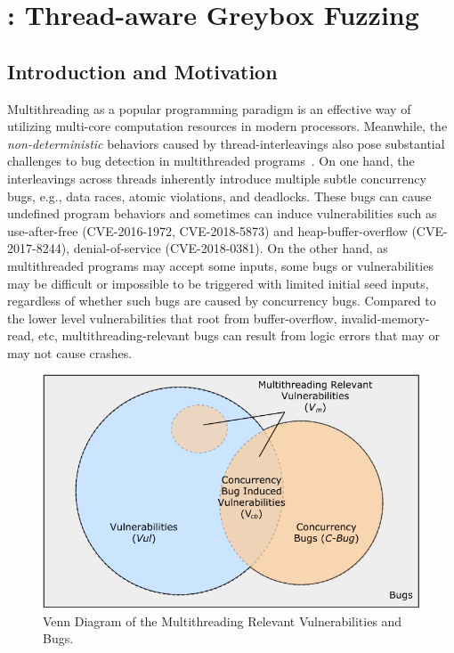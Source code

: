 
\chapter{\mtfuzz: Thread-aware Greybox Fuzzing} \label{ch:mtfuzz}

\section{Introduction and Motivation}\label{sec:mtfuzz_intro}

Multithreading as a popular programming paradigm is an effective way of utilizing multi-core computation resources in modern processors. Meanwhile, the \emph{non-deterministic} behaviors caused by thread-interleavings also pose substantial challenges to bug detection in multithreaded programs~\cite{mtbugs_survey}. On one hand, the interleavings across threads inherently introduce multiple subtle concurrency bugs, e.g., data races, atomic violations, and deadlocks. These bugs can cause undefined program behaviors and sometimes can induce vulnerabilities such as use-after-free (CVE-2016-1972, CVE-2018-5873) and heap-buffer-overflow (CVE-2017-8244), denial-of-service (CVE-2018-0381). On the other hand, as multithreaded programs may accept some inputs, some bugs or vulnerabilities may be difficult or impossible to be triggered with limited initial seed inputs, regardless of whether such bugs are caused by concurrency bugs. Compared to the lower level vulnerabilities that root from buffer-overflow, invalid-memory-read, etc, multithreading-relevant bugs can result from logic errors that may or may not cause crashes.


\begin{figure}[ht]
\begin{center}
	\includegraphics[width=0.75\columnwidth]{res/venn}
	\caption{Venn Diagram of the Multithreading Relevant Vulnerabilities and Bugs.}
	\label{fig:venn_con_vul}
\end{center}	
\end{figure}



